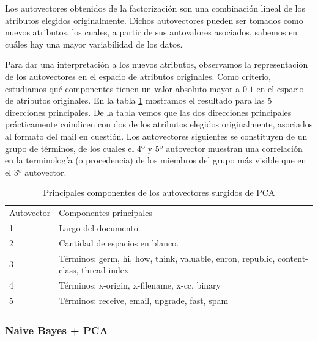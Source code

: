 \documentclass[a4paper,10pt]{article}
\begin{document}
\par Los autovectores obtenidos de la factorización son una combinación lineal de los atributos elegidos originalmente. Dichos autovectores pueden ser tomados como nuevos atributos, los cuales, a partir de sus autovalores asociados, sabemos en cuáles hay una mayor variabilidad de los datos. 
\par Para dar una interpretación a los nuevos atributos, observamos la representación de los autovectores en el espacio de atributos originales. Como criterio, estudiamos qué componentes tienen un valor absoluto mayor a $0.1$ en el espacio de atributos originales. En la tabla \ref{table:autovectores} mostramos el resultado para las 5 direcciones principales. De la tabla vemos que las dos direcciones principales prácticamente coindicen con dos de los atributos elegidos originalmente, asociados al formato del mail en cuestión. Los autovectores siguientes se constituyen de un grupo de términos, de los cuales el 4º y 5º autovector muestran una correlación en la terminología (o procedencia) de los miembros del grupo más visible que en el 3º autovector. 
\begin{table}[H]
\centering
\begin{tabular}{ll}
Autovector & Componentes principales \\
1 & Largo del documento. \\
2 & Cantidad de espacios en blanco. \\
3 & Términos: germ, hi, how, think, valuable, enron, republic, content-class, thread-index. \\
4 & Términos: x-origin, x-filename, x-cc, binary \\
5 & Términos: receive, email, upgrade, fast, spam \\
\end{tabular}
\caption{Principales componentes de los autovectores surgidos de PCA}
\label{table:autovectores}
\end{table}

\subsubsection{Naive Bayes + PCA}\label{sec:NB_PCA}
\end{document}
